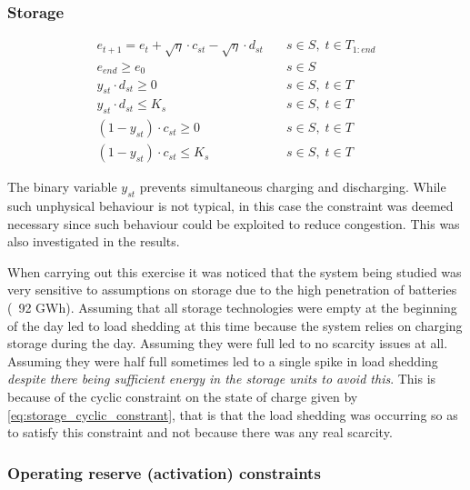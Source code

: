\documentclass[number,times]{elsarticle}
\begin{document}
\subsubsection{Storage}

\begin{align}
    e_{t+1} = e_t + \sqrt{\eta} \cdot c_{st} - \sqrt{\eta} \cdot d_{st} & \quad s \in S, \; t \in T_{1:end}                   \\
    e_{end} \geq e_0                                                    & \quad s \in S   \label{eq:storage_cyclic_constrant} \\
    y_{st} \cdot d_{st} \geq 0                                          & \quad s \in S, \; t \in T                           \\
    y_{st} \cdot d_{st} \leq K_s                                        & \quad s \in S, \; t \in T                           \\
    (1 - y_{st}) \cdot c_{st} \geq 0                                    & \quad s \in S, \; t \in T                           \\
    (1 - y_{st}) \cdot c_{st} \leq K_s                                  & \quad s \in S, \; t \in T
\end{align}

The binary variable $y_{st}$ prevents simultaneous charging and discharging. While such unphysical behaviour is not typical, in this case the constraint was deemed necessary since such behaviour could be exploited to reduce congestion. This was also investigated in the results.

When carrying out this exercise it was noticed that the system being studied was very sensitive to assumptions on storage due to the high penetration of batteries (~92 GWh). Assuming that all storage technologies were empty at the beginning of the day led to load shedding at this time because the system relies on charging storage during the day. Assuming they were full led to no scarcity issues at all. Assuming they were half full sometimes led to a single spike in load shedding \emph{despite there being sufficient energy in the storage units to avoid this}. This is because of the cyclic constraint on the state of charge given by \eqref{eq:storage_cyclic_constrant}, that is that the load shedding was occurring so as to satisfy this constraint and not because there was any real scarcity.

\subsubsection{Operating reserve (activation) constraints}
\end{document}
